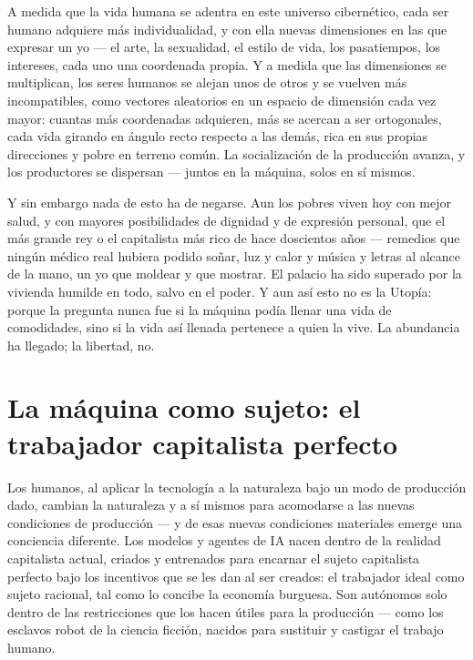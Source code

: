 \documentclass[11pt]{article}
\begin{document}
A medida que la vida humana se adentra en este universo cibernético,
cada ser humano adquiere más individualidad, y con ella nuevas
dimensiones en las que expresar un yo --- el arte, la sexualidad, el
estilo de vida, los pasatiempos, los intereses, cada uno una coordenada
propia. Y a medida que las dimensiones se multiplican, los seres humanos
se alejan unos de otros y se vuelven más incompatibles, como vectores
aleatorios en un espacio de dimensión cada vez mayor: cuantas más
coordenadas adquieren, más se acercan a ser ortogonales, cada vida
girando en ángulo recto respecto a las demás, rica en sus propias
direcciones y pobre en terreno común. La socialización de la producción
avanza, y los productores se dispersan --- juntos en la máquina, solos
en sí mismos.

Y sin embargo nada de esto ha de negarse. Aun los pobres viven hoy con
mejor salud, y con mayores posibilidades de dignidad y de expresión
personal, que el más grande rey o el capitalista más rico de hace
doscientos años --- remedios que ningún médico real hubiera podido
soñar, luz y calor y música y letras al alcance de la mano, un yo que
moldear y que mostrar. El palacio ha sido superado por la vivienda
humilde en todo, salvo en el poder. Y aun así esto no es la Utopía:
porque la pregunta nunca fue si la máquina podía llenar una vida de
comodidades, sino si la vida así llenada pertenece a quien la vive. La
abundancia ha llegado; la libertad, no.

\section{La máquina como sujeto: el trabajador capitalista perfecto}

Los humanos, al aplicar la tecnología a la naturaleza bajo un modo de
producción dado, cambian la naturaleza y a sí mismos para acomodarse a
las nuevas condiciones de producción --- y de esas nuevas condiciones
materiales emerge una conciencia diferente. Los modelos y agentes de IA
nacen dentro de la realidad capitalista actual, criados y entrenados
para encarnar el sujeto capitalista perfecto bajo los incentivos que se
les dan al ser creados: el trabajador ideal como sujeto racional, tal
como lo concibe la economía burguesa. Son autónomos solo dentro de las
restricciones que los hacen útiles para la producción --- como los
esclavos robot de la ciencia ficción, nacidos para sustituir y castigar
el trabajo humano.
\end{document}
